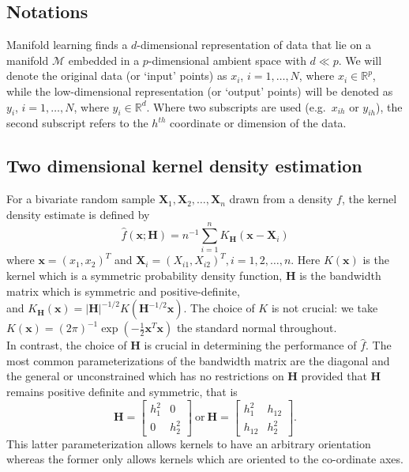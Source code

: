 \documentclass[11pt,a4paper,]{article}
\begin{document}
\hypertarget{notations}{%
\subsection{Notations}\label{notations}}

Manifold learning finds a \(d\)-dimensional representation of data that lie on a manifold \(\mathcal{M}\) embedded in a \(p\)-dimensional ambient space with \(d \ll p\). We will denote the original data (or `input' points) as \(x_i\), \(i=1,\dots,N\), where \(x_i\in\mathbb{R}^p\), while the low-dimensional representation (or `output' points) will be denoted as \(y_i\), \(i=1,\dots,N\), where \(y_i\in\mathbb{R}^d\). Where two subscripts are used (e.g.~\(x_{ih}\) or \(y_{ih}\)), the second subscript refers to the \(h^{th}\) coordinate or dimension of the data.

\hypertarget{two-dimensional-kernel-density-estimation}{%
\subsection{Two dimensional kernel density estimation}\label{two-dimensional-kernel-density-estimation}}

For a bivariate random sample \(\pmb X_1, \pmb X_2, \ldots, \pmb X_n\)
drawn from a density \(f\),
the kernel density estimate is defined by
\[
\hat{f} (\pmb x; \pmb H) = n^{-1}\sum_{i=1}^n K_{\pmb H} ( \pmb x - \pmb{X}_i)
\]
where \(\pmb x = (x_1, x_2)^T\) and \(\pmb{X}_i = (X_{i1}, X_{i2})^T, i = 1, 2, \ldots, n\). Here
\(K(\pmb x)\) is the kernel which is a symmetric probability density function,
\(\pmb H\) is the bandwidth matrix which is symmetric and positive-definite,\\
and \(K_{\pmb H}(\pmb x) = |\pmb H|^{-1/2} K( \pmb H^{-1/2} \pmb x)\).
The choice of \(K\) is not crucial: we take
\(K(\pmb x) = (2\pi)^{-1} \exp(-\tfrac{1}{2} \pmb x^T \pmb x)\) the standard normal
throughout.\\
In contrast, the choice of \(\pmb H\) is crucial in determining the performance of \(\hat f\).
The most common parameterizations of the bandwidth matrix
are the diagonal and the
general or unconstrained which has no restrictions on \(\pmb H\)
provided that \(\pmb H\) remains positive definite and symmetric, that is
\[
\pmb H = \begin{bmatrix}h_1^2 & 0 \\0 & h_2^2 \end{bmatrix}
\ \mathrm{or} \ 
\pmb H = \begin{bmatrix}h_1^2 & h_{12} \\ h_{12}  & h_2^2 \end{bmatrix}.
\]
This latter parameterization allows kernels to have an arbitrary orientation
whereas the former only allows kernels which are oriented to the
co-ordinate axes.
\end{document}
